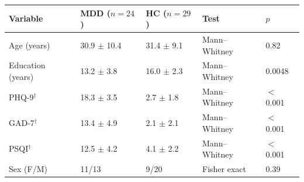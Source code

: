 \begin{tabular}{@{}lllll@{}}
\toprule
Variable & MDD ($n=24$) & HC ($n=29$) & Test & $p$ \\
\midrule
Age (years) & 30.9 $\pm$ 10.4 & 31.4 $\pm$ 9.1 & Mann--Whitney & 0.82 \\
Education (years) & 13.2 $\pm$ 3.8 & 16.0 $\pm$ 2.3 & Mann--Whitney & 0.0048 \\
PHQ-9$^\dagger$ & 18.3 $\pm$ 3.5 & 2.7 $\pm$ 1.8 & Mann--Whitney & $<$0.001 \\
GAD-7$^\dagger$ & 13.4 $\pm$ 4.9 & 2.1 $\pm$ 2.1 & Mann--Whitney & $<$0.001 \\
PSQI$^\dagger$ & 12.5 $\pm$ 4.2 & 4.1 $\pm$ 2.2 & Mann--Whitney & $<$0.001 \\
Sex (F/M) & 11/13 & 9/20 & Fisher exact & 0.39 \\
\bottomrule
\end{tabular}